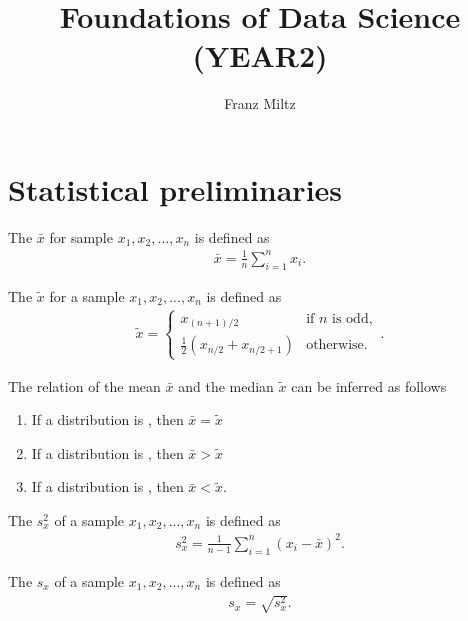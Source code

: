 \documentclass{article}
\begin{document}
\title{Foundations of Data Science (YEAR2)}
\author{Franz Miltz}
\maketitle
\tableofcontents
\pagebreak
\section{Statistical preliminaries}
\begin{definition}
	The  $\bar{x}$ for sample $x_1, x_2, ..., x_n$
	is defined as
	\begin{align*}
		\bar{x} = \frac{1}{n}\sum_{i=1}^n x_i.
	\end{align*}
\end{definition}
\begin{definition}
	The  $\tilde x$ for a sample $x_1, x_2, ..., x_n$ is defined as 
	\begin{align*}
		\tilde x = \begin{cases}
			x_{(n+1)/2} 				   &\text{if $n$ is odd},\\
			\frac{1}{2}(x_{n/2}+x_{n/2+1}) &\text{otherwise}.
		\end{cases}.
	\end{align*}
\end{definition}
\begin{theorem}
	The relation of the mean $\bar x$ and the median $\tilde x$ can be inferred as follows
	\begin{enumerate}
		\item If a distribution is , then $\bar x = \tilde x$
		\item If a distribution is , then $\bar x > \tilde x$
		\item If a distribution is , then $\bar x < \tilde x$.
	\end{enumerate}
\end{theorem}
\begin{definition}
	The  $s_x^2$ of a sample $x_1, x_2, ..., x_n$ is defined as
	\begin{align*}
		s_x^2 = \frac{1}{n-1}\sum_{i=1}^n (x_i-\bar x)^2.
	\end{align*}
\end{definition}
\begin{definition}
	The  $s_x$ of a sample $x_1, x_2, ..., x_n$ is defined as
	\begin{align*}
		s_x = \sqrt{s_x^2}.
	\end{align*}
\end{definition}
\end{document}

